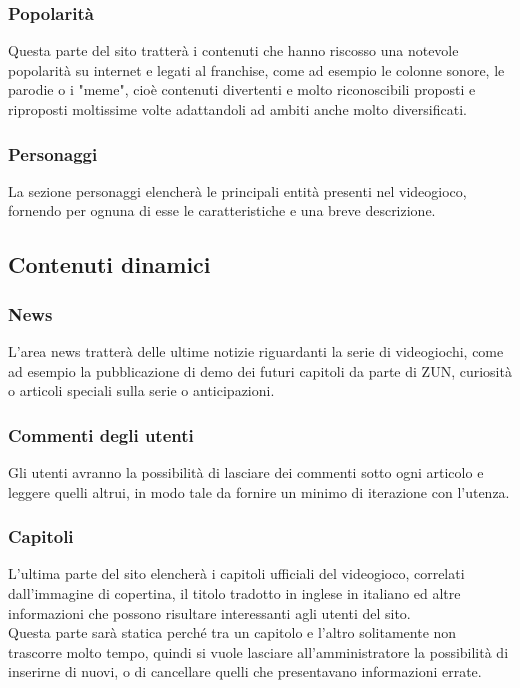 \documentclass[openany, a4paper, 12pt]{report}
\begin{document}
		\subsubsection{Popolarità}
		Questa parte del sito tratterà i contenuti che hanno riscosso una notevole popolarità su internet e legati al franchise, come ad esempio le colonne sonore, le parodie o i "meme", cioè contenuti divertenti e molto riconoscibili proposti e riproposti moltissime volte adattandoli ad ambiti anche molto diversificati.
		\subsubsection{Personaggi}
		La sezione personaggi elencherà le principali entità presenti nel videogioco, fornendo per ognuna di esse le caratteristiche e una breve descrizione.
		
	\subsection{Contenuti dinamici}
		\subsubsection{News}
		L'area news tratterà delle ultime notizie riguardanti la serie di videogiochi, come ad esempio la pubblicazione di demo dei futuri capitoli da parte di ZUN, curiosità o articoli speciali sulla serie o anticipazioni.
		
		\subsubsection{Commenti degli utenti}
		Gli utenti avranno la possibilità di lasciare dei commenti sotto ogni articolo e leggere quelli altrui, in modo tale da fornire un minimo di iterazione con l'utenza.
		
		\subsubsection{Capitoli}
		L'ultima parte del sito elencherà i capitoli ufficiali del videogioco, correlati dall'immagine di copertina, il titolo tradotto in inglese in italiano ed altre informazioni che possono risultare interessanti agli utenti del sito.\\
		Questa parte sarà statica perché tra un capitolo e l'altro solitamente non trascorre molto tempo, quindi si vuole lasciare all'amministratore la possibilità di inserirne di nuovi, o di cancellare quelli che presentavano informazioni errate.
	
\end{document}
